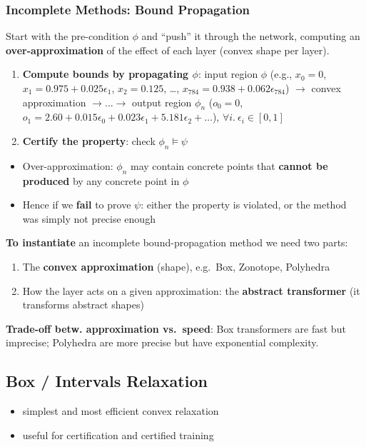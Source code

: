 \subsubsection{Incomplete Methods: Bound Propagation}
Start with the pre-condition $\phi$ and ``push'' it through the network, computing an
\textbf{over-approximation} of the effect of each layer (convex shape per layer).
\begin{enumerate}
  \item \textbf{Compute bounds by propagating $\phi$}: input region $\phi$ (e.g., $x_0 = 0$, $x_1 = 0.975 + 0.025\epsilon_1$, $x_2 = 0.125$, \dots,
        $x_{784} = 0.938 + 0.062\epsilon_{784}$) $\to$ convex approximation
    $\to \dots \to$ output region $\phi_n$ 
    ($o_0 = 0$, $o_1 = 2.60 + 0.015\epsilon_0 + 0.023\epsilon_1 + 5.181\epsilon_2 + \dots$), $\forall i.\ \epsilon_i \in [0,1]$
  \item \textbf{Certify the property}: check $\phi_n \models \psi$
\end{enumerate}
\begin{itemize}
  \item Over-approximation: $\phi_n$ may contain concrete points that \textbf{cannot be produced} by any
    concrete point in $\phi$
  \item Hence if we \textbf{fail} to prove $\psi$: either the property is violated, or the method was
    simply not precise enough
\end{itemize}

\textbf{To instantiate} an incomplete bound-propagation method we need two parts:
\begin{enumerate}
  \item The \textbf{convex approximation} (shape), e.g.\ Box, Zonotope, Polyhedra
  \item How the layer acts on a given approximation: the \textbf{abstract transformer} (it transforms
    abstract shapes)
\end{enumerate}
\textbf{Trade-off betw. approximation vs.\ speed}: Box transformers are fast but imprecise; Polyhedra are more
precise but have exponential complexity.

\subsection{Box / Intervals Relaxation}
\begin{itemize}
    \item simplest and most efficient convex relaxation
    \item useful for certification and certified training
\end{itemize}

